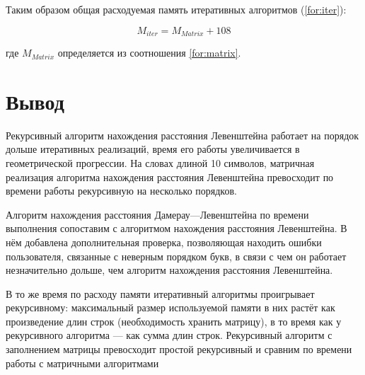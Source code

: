 Таким образом общая расходуемая память итеративных алгоритмов (\ref{for:iter}):

\begin{equation}
M_{iter} = M_{Matrix} + 108
\label{for:iter}
\end{equation}

где $M_{Matrix}$ определяется из соотношения \ref{for:matrix}.

\section{Вывод}

Рекурсивный алгоритм нахождения расстояния Левенштейна работает
на порядок дольше итеративных реализаций, время его работы увеличивается в геометрической прогрессии. На словах длиной 10 символов, матричная реализация алгоритма нахождения расстояния Левенштейна превосходит по времени работы рекурсивную на несколько порядков.

Алгоритм нахождения расстояния Дамерау—Левенштейна по времени выполнения сопоставим с алгоритмом нахождения расстояния Левенштейна. В нём добавлена дополнительная проверка, позволяющая находить ошибки пользователя, связанные с неверным порядком букв, в связи с чем он работает незначительно дольше, чем алгоритм нахождения расстояния Левенштейна.
    
В то же время по расходу памяти итеративный алгоритмы проигрывает рекурсивному: максимальный размер используемой памяти в них растёт как произведение длин строк (необходимость хранить матрицу), в то время как у рекурсивного алгоритма — как сумма длин строк. Рекурсивный алгоритм с заполнением матрицы превосходит простой рекурсивный и сравним по времени работы с матричными алгоритмами
